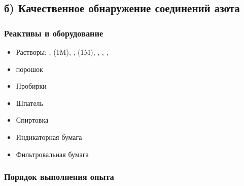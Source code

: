 \documentclass[a4paper, 12pt]{article}
\begin{document}
\subsection*{б) Качественное обнаружение соединений азота}

\subsubsection{Реактивы и оборудование}

\begin{itemize}
	\item Растворы: ,  (1M), ,  (1M), , , , 
	
	\item {} порошок
	
	\item Пробирки
	
	\item Шпатель
	
	\item Спиртовка
	
	\item Индикаторная бумага
	
	\item Фильтровальная бумага
\end{itemize}

\subsubsection{Порядок выполнения опыта}
\end{document}
